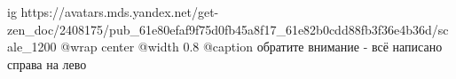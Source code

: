  
 
 
 
 

\ifcmt
  ig https://avatars.mds.yandex.net/get-zen_doc/2408175/pub_61e80efaf9f75d0fb45a8f17_61e82b0cdd88fb3f36e4b36d/scale_1200
	@wrap center
	@width 0.8
	@caption обратите внимание - всё написано справа на лево
\fi

